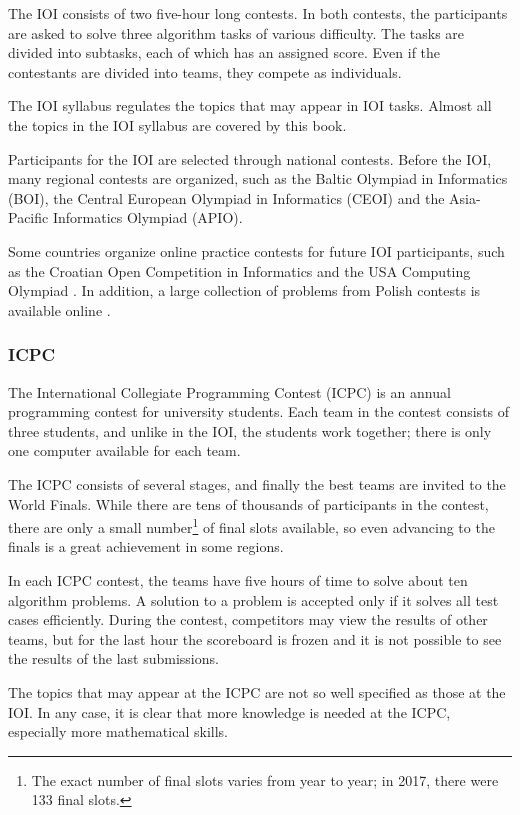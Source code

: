 The IOI consists of two five-hour long contests.
In both contests, the participants are asked to
solve three algorithm tasks of various difficulty.
The tasks are divided into subtasks,
each of which has an assigned score.
Even if the contestants are divided into teams,
they compete as individuals.

The IOI syllabus \cite{iois} regulates the topics
that may appear in IOI tasks.
Almost all the topics in the IOI syllabus
are covered by this book.

Participants for the IOI are selected through
national contests.
Before the IOI, many regional contests are organized,
such as the Baltic Olympiad in Informatics (BOI),
the Central European Olympiad in Informatics (CEOI)
and the Asia-Pacific Informatics Olympiad (APIO).

Some countries organize online practice contests
for future IOI participants,
such as the Croatian Open Competition in Informatics \cite{coci}
and the USA Computing Olympiad \cite{usaco}.
In addition, a large collection of problems from Polish contests
is available online \cite{main}.

\subsubsection{ICPC}

The International Collegiate Programming Contest (ICPC)
is an annual programming contest for university students.
Each team in the contest consists of three students,
and unlike in the IOI, the students work together;
there is only one computer available for each team.

The ICPC consists of several stages, and finally the
best teams are invited to the World Finals.
While there are tens of thousands of participants
in the contest, there are only a small number\footnote{The exact number of final
slots varies from year to year; in 2017, there were 133 final slots.} of final slots available,
so even advancing to the finals
is a great achievement in some regions.

In each ICPC contest, the teams have five hours of time to
solve about ten algorithm problems.
A solution to a problem is accepted only if it solves
all test cases efficiently.
During the contest, competitors may view the results of other teams,
but for the last hour the scoreboard is frozen and it
is not possible to see the results of the last submissions.

The topics that may appear at the ICPC are not so well
specified as those at the IOI.
In any case, it is clear that more knowledge is needed
at the ICPC, especially more mathematical skills.

